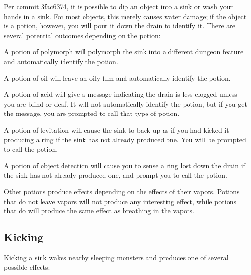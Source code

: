 Per commit 3fac6374\footnotemark[45], it is possible to dip\footnotemark[46] an object into a sink or wash your hands in a sink. For most objects, this merely causes water damage\footnotemark[47]; if the object is a potion\footnotemark[48], however, you will pour it down the drain to identify it. There are several potential outcomes depending on the potion:




\begin{myitemize}\item{}A potion of polymorph\footnotemark[49] will polymorph the sink into a different dungeon feature and automatically identify the potion.
\item{}A potion of oil\footnotemark[50] will leave an oily film and automatically identify the potion.
\item{}A potion of acid\footnotemark[51] will give a message indicating the drain is less clogged unless you are blind or deaf. It will not automatically identify the potion, but if you get the message, you are prompted to call that type of potion.
\item{}A potion of levitation\footnotemark[52] will cause the sink to back up as if you had kicked it, producing a ring if the sink has not already produced one. You will be prompted to call the potion.
\item{}A potion of object detection\footnotemark[53] will cause you to sense a ring lost down the drain if the sink has not already produced one, and prompt you to call the potion.
\item{}Other potions produce effects depending on the effects of their vapors\footnotemark[54]. Potions that do not leave vapors will not produce any interesting effect, while potions that do will produce the same effect as breathing in the vapors.
\end{myitemize}

\subsection{Kicking}
\label{2}
Kicking a sink wakes nearby sleeping\footnotemark[55] monsters and produces one of several possible effects:



